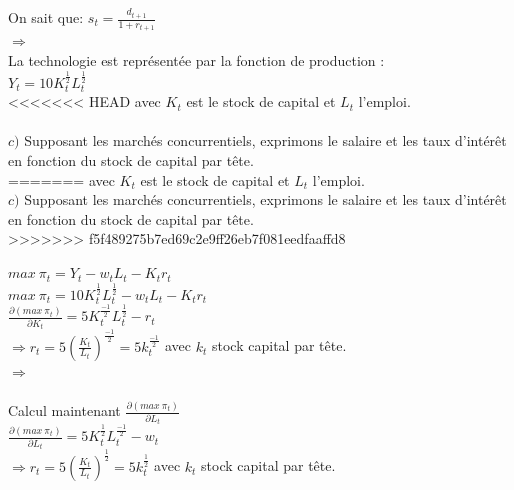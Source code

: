 \documentclass[11pt,twoside,a4paper]{article}
\begin{document}
 On sait que: $ s_t = \frac{d_{t+1}}{1+r_{t+1}} $\\
 
 $ \Rightarrow$   \\
 
 La technologie est représentée par la fonction de production :\\
 
 $Y_t=10K_t^{\frac{1}{2}}L_t^{\frac{1}{2}}$\\
 
<<<<<<< HEAD
 avec $K_t$ est le stock de capital et $L_t$ l'emploi.\\ \\
 $c)$ Supposant les marchés concurrentiels, exprimons le salaire et les taux d'intér\^{e}t en fonction du stock de capital par t\^{e}te.\\
=======
 avec $K_t$ est le stock de capital et $L_t$ l'emploi.\\
 
 $c)$ Supposant les marchés concurrentiels, exprimons le salaire et les taux d'intér\^{e}t
en fonction du stock de capital par t\^{e}te.\\
>>>>>>> f5f489275b7ed69c2e9ff26eb7f081eedfaaffd8

$ max\ \pi_t= Y_t -w_tL_t-K_t r_t $\\

 $ max\ \pi_t=10K_t^{\frac{1}{2}}L_t^{\frac{1}{2}}-w_tL_t-K_t r_t $\\
 
 $
  \frac{\partial (max\ \pi_t)}{\partial K_t}=5K_t^{\frac{-1}{2}}L_t^{\frac{1}{2}}-r_t $\\
 
$ \Rightarrow r_t= 5(\frac{K_t}{L_t})^{\frac{-1}{2}}=5k_t^{\frac{-1}{2}}$ \: avec $k_t$ stock capital par t\^{e}te.\\


 $ \Rightarrow$   \\
 \\Calcul maintenant $\frac{\partial (max\ \pi_t)}{\partial L_t}$\\
 
 $\frac{\partial (max\ \pi_t)}{\partial L_t}=5K_t^{\frac{1}{2}}L_t^{\frac{-1}{2}}-w_t$\\
 
 $ \Rightarrow r_t= 5(\frac{K_t}{L_t})^{\frac{1}{2}}=5k_t^{\frac{1}{2}}$ \: avec $k_t$ stock capital par t\^{e}te.\\
\end{document}
